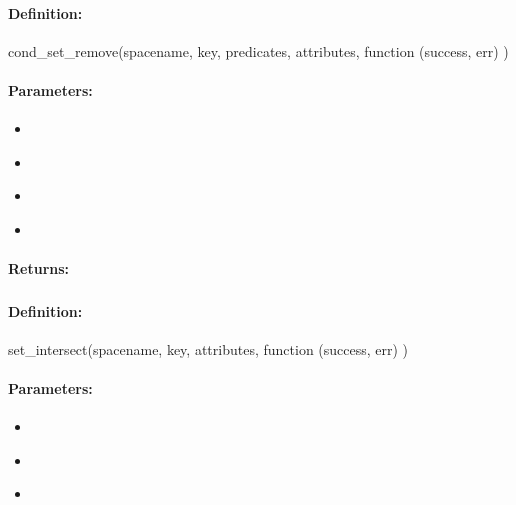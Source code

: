 \paragraph{Definition:}
\begin{javascriptcode}
cond_set_remove(spacename, key, predicates, attributes, function (success, err) {})
\end{javascriptcode}
\paragraph{Parameters:}
\begin{itemize}[noitemsep]
\item {}\\

\item {}\\

\item {}\\

\item {}\\

\end{itemize}

\paragraph{Returns:}


\pagebreak
\subsubsection{}
\label{api:nodejs:set_intersect}


\paragraph{Definition:}
\begin{javascriptcode}
set_intersect(spacename, key, attributes, function (success, err) {})
\end{javascriptcode}
\paragraph{Parameters:}
\begin{itemize}[noitemsep]
\item {}\\

\item {}\\

\item {}\\

\end{itemize}

